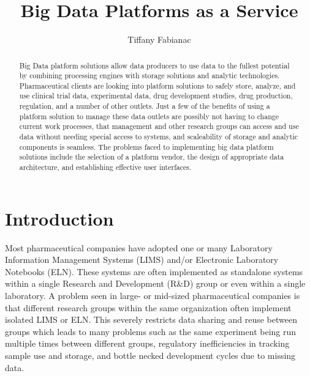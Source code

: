 \documentclass[sigconf]{acmart}
\begin{document}
\title{Big Data Platforms as a Service}


\author{Tiffany Fabianac}
\orcid{}

\renewcommand{\shortauthors}{T. Fabianac}


\begin{abstract}
Big Data platform solutions allow data producers to use data to the fullest potential by combining processing engines with storage solutions and analytic technologies. Pharmaceutical clients are looking into platform solutions to safely store, analyze, and use clinical trial data, experimental data, drug development studies, drug production, regulation, and a number of other outlets. Just a few of the benefits of using a platform solution to manage these data outlets are possibly not having to change current work processes, that management and other research groups can access and use data without needing special access to systems, and scaleability of storage and analytic components is seamless. The problems faced to implementing big data platform solutions include the selection of a platform vendor, the design of appropriate data architecture, and establishing effective user interfaces.
\end{abstract}



\maketitle

\section{Introduction}
Most pharmaceutical companies have adopted one or many Laboratory Information Management Systems (LIMS) and/or Electronic Laboratory Notebooks (ELN). These systems are often implemented as standalone systems within a single Research and Development (R\&D) group or even within a single laboratory. A problem seen in large- or mid-sized pharmaceutical companies is that different research groups within the same organization often implement isolated LIMS or ELN. This severely restricts data sharing and reuse between groups which leads to many problems such as the same experiment being run multiple times between different groups, regulatory inefficiencies in tracking sample use and storage, and bottle necked development cycles due to missing data. 
\end{document}

